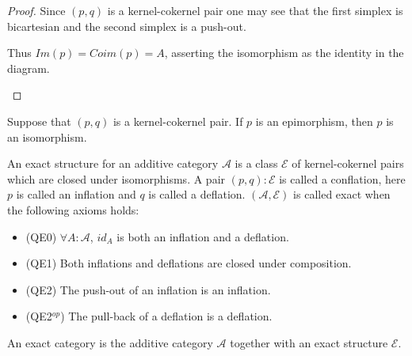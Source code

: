     \begin{proof}
        Since $(p,q)$ is a kernel-cokernel pair one may see that the first simplex is bicartesian and the second simplex is a push-out.
        \begin{center}
        \end{center}
        Thus $Im(p)=Coim(p)=A$, asserting the isomorphism as the identity in the diagram.
        \begin{center}
        \end{center}
    \end{proof}

    \begin{corollary}
        Suppose that $(p,q)$ is a kernel-cokernel pair. If $p$ is an epimorphism, then $p$ is an isomorphism.
    \end{corollary}

    \begin{definition}
        An exact structure for an additive category $\mathcal{A}$ is a class $\mathcal{E}$ of kernel-cokernel pairs which are closed under isomorphisms. A pair $(p,q):\mathcal{E}$ is called a conflation, here $p$ is called an inflation and $q$ is called a deflation. $(\mathcal{A},\mathcal{E})$ is called exact when the following axioms holds:
        \begin{itemize}
            \item (QE0) $\forall A:\mathcal{A}$, $id_A$ is both an inflation and a deflation.
            \item (QE1) Both inflations and deflations are closed under composition.
            \item (QE2) The push-out of an inflation is an inflation.
            \item (QE2$^{op}$) The pull-back of a deflation is a deflation.
        \end{itemize}

        An exact category is the additive category $\mathcal{A}$ together with an exact structure $\mathcal{E}$.
    \end{definition}


